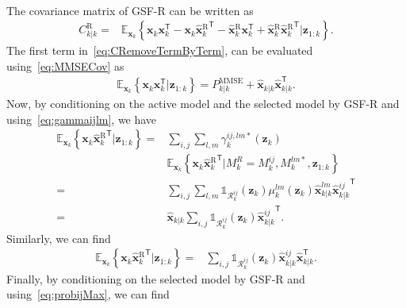 \documentclass[10pt,twocolumn,twoside]{IEEEtran}
\newcommand{\tran}{^{\mathsf{T}}}
\newcommand{\expectx}{\mathds{E}_{\mathbf{x}_k}\!}
\newcommand{\Pmmse}{P_{k|k}^{\mathrm{MMSE}}}
\newcommand{\corcol}[1]{\textcolor{CorCol}{#1}}
\begin{document}
\begin{IEEEproof}
\begin{align}
\end{align}
The covariance matrix of GSF-R can be written as
\corcol{\begin{align}
\label{eq:CRemoveTermByTerm}
C_{k|k}^{\mathrm{R}} = & \expectx{\left\lbrace \mathbf{x}_{k}\mathbf{x}_{k}\tran - \mathbf{x}_{k}\hat{\mathbf{{x}}}{_{k}^{\mathrm{R}}}\tran  -\hat{\mathbf{{x}}}{_{k}^{\mathrm{R}}}\mathbf{x}_{k}\tran + \hat{\mathbf{{x}}}{_{k}^{\mathrm{R}}}\hat{\mathbf{{x}}}{_{k}^{\mathrm{R}}}\tran \big| \mathbf{{z}}_{1:k} \right\rbrace}.
\end{align}
The first term in~\eqref{eq:CRemoveTermByTerm}, can be evaluated using~\eqref{eq:MMSECov} as
\begin{align}
\expectx{\left\lbrace \mathbf{x}_{k}\mathbf{x}_{k}\tran | \mathbf{{z}}_{1:k}\right\rbrace} = \Pmmse + \mathsf{\hat{\boldsymbol{x}}}_{k|k}\mathsf{\hat{\boldsymbol{x}}}_{k|k}\tran.
\end{align}
Now, by conditioning on the active model and the selected model by GSF-R and using~\eqref{eq:gammaijlm}, we have
\begin{align}
\nonumber
\expectx{\left\lbrace \mathbf{x}_{k}\hat{\mathbf{{x}}}{_{k}^{\mathrm{R}}}\tran \big| \mathbf{{z}}_{1:k} \right\rbrace} = & \sum\limits_{i,j} \sum\limits_{l,m} \gamma_k^{ij,lm*}{\left(\mathbf{z}_k\right)}\\
& \expectx{\left\lbrace \mathbf{x}_{k}\hat{\mathbf{{x}}}{_{k}^{\mathrm{R}}}\tran \big|M^{R}_k = M_k^{ij}, M_k^{lm*}, \mathbf{{z}}_{1:k} \right\rbrace} \\
=& \sum\limits_{i,j} \sum\limits_{l,m} \mathds{1}_{\mathcal{R}^{ij}_k}{\left(\mathbf{z}_k\right)}\mu_k^{lm}{\left(\mathbf{z}_{k}\right)} \mathsf{\hat{\boldsymbol{x}}}_{k|k}^{lm}\mathsf{\hat{\boldsymbol{x}}}{_{k|k}^{ij}}\tran \\
=& \mathsf{\hat{\boldsymbol{x}}}_{k|k} \sum\limits_{i,j} \mathds{1}_{\mathcal{R}^{ij}_k}{\left(\mathbf{z}_k\right)} \mathsf{\hat{\boldsymbol{x}}}{_{k|k}^{ij}}\tran.
\end{align}
Similarly, we can find 
\begin{align}
\expectx{\left\lbrace \mathbf{x}_{k}\hat{\mathbf{{x}}}{_{k}^{\mathrm{R}}}\tran \big| \mathbf{{z}}_{1:k} \right\rbrace} = & \sum\limits_{i,j} \mathds{1}_{\mathcal{R}^{ij}_k}{\left(\mathbf{z}_k\right)} \mathsf{\hat{\boldsymbol{x}}}{_{k|k}^{ij}} \mathsf{\hat{\boldsymbol{x}}}_{k|k} \tran.
\end{align}
Finally, by conditioning on the selected model by GSF-R and using~\eqref{eq:probijMax}, we can find
\begin{align}

\end{align}}
\end{IEEEproof}
\end{document}
